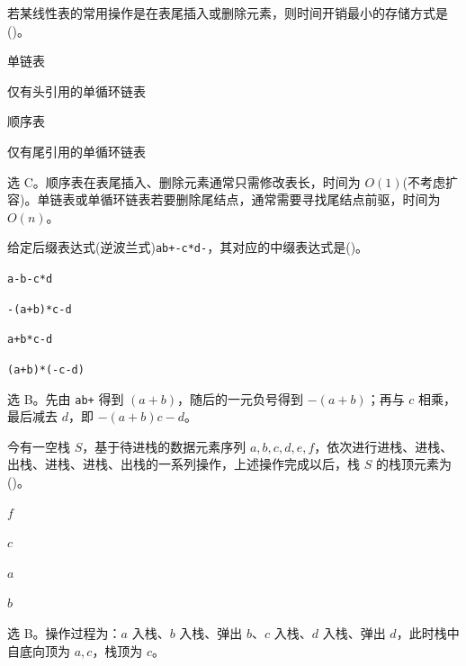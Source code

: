 \begin{question}
若某线性表的常用操作是在表尾插入或删除元素，则时间开销最小的存储方式是(\quad)。
\begin{choiceoptions}[1]
  \item 单链表
  \item 仅有头引用的单循环链表
  \item 顺序表
  \item 仅有尾引用的单循环链表
\end{choiceoptions}
\begin{solution}
选 C。顺序表在表尾插入、删除元素通常只需修改表长，时间为 $O(1)$(不考虑扩容)。单链表或单循环链表若要删除尾结点，通常需要寻找尾结点前驱，时间为 $O(n)$。
\end{solution}
\end{question}

\begin{question}
给定后缀表达式(逆波兰式)\texttt{ab+-c*d-}，其对应的中缀表达式是(\quad)。
\begin{choiceoptions}[1]
  \item \texttt{a-b-c*d}
  \item \texttt{-(a+b)*c-d}
  \item \texttt{a+b*c-d}
  \item \texttt{(a+b)*(-c-d)}
\end{choiceoptions}
\begin{solution}
选 B。先由 \texttt{ab+} 得到 $(a+b)$，随后的一元负号得到 $-(a+b)$；再与 $c$ 相乘，最后减去 $d$，即 $-(a+b)c-d$。
\end{solution}
\end{question}

\begin{question}
今有一空栈 $S$，基于待进栈的数据元素序列 $a,b,c,d,e,f$，依次进行进栈、进栈、出栈、进栈、进栈、出栈的一系列操作，上述操作完成以后，栈 $S$ 的栈顶元素为(\quad)。
\begin{choiceoptions}[4]
  \item $f$
  \item $c$
  \item $a$
  \item $b$
\end{choiceoptions}
\begin{solution}
选 B。操作过程为：$a$ 入栈、$b$ 入栈、弹出 $b$、$c$ 入栈、$d$ 入栈、弹出 $d$，此时栈中自底向顶为 $a,c$，栈顶为 $c$。
\end{solution}
\end{question}

